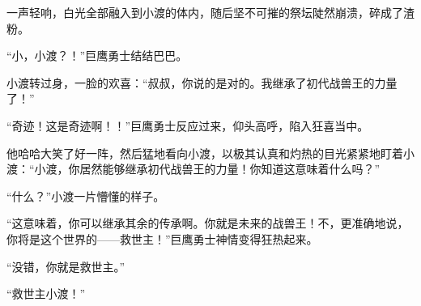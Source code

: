 \begin{this_body}
一声轻响，白光全部融入到小渡的体内，随后坚不可摧的祭坛陡然崩溃，碎成了渣粉。

“小，小渡？！”巨鹰勇士结结巴巴。

小渡转过身，一脸的欢喜：“叔叔，你说的是对的。我继承了初代战兽王的力量了！”

“奇迹！这是奇迹啊！！”巨鹰勇士反应过来，仰头高呼，陷入狂喜当中。

他哈哈大笑了好一阵，然后猛地看向小渡，以极其认真和灼热的目光紧紧地盯着小渡：“小渡，你居然能够继承初代战兽王的力量！你知道这意味着什么吗？”

“什么？”小渡一片懵懂的样子。

“这意味着，你可以继承其余的传承啊。你就是未来的战兽王！不，更准确地说，你将是这个世界的——救世主！”巨鹰勇士神情变得狂热起来。

“没错，你就是救世主。”

“救世主小渡！”

\end{this_body}

